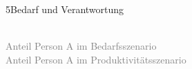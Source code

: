 \documentclass[xcolor=table,9pt,aspectratio=169]{beamer}
\begin{document}
\begin{frame}{\vspace*{10mm}5\hspace*{1em}Bedarf und Verantwortung}
\begin{multicols}{2}
   \begin{center}
      \\
      \footnotesize{\textcolor{gray}{Anteil Person A im Bedarfsszenario}}
      \\
      \footnotesize{\textcolor{gray}{Anteil Person A im Produktivitätsszenario}}
   \end{center}
\end{multicols}
\end{frame}
\end{document}
